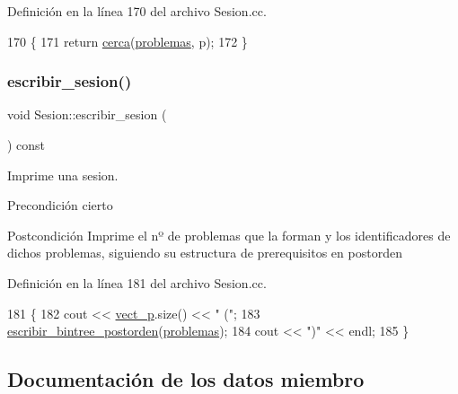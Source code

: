 Definición en la línea 170 del archivo Sesion.\+cc.


\begin{DoxyCode}
170                                                         \{
171         \textcolor{keywordflow}{return} \mbox{\hyperlink{class_sesion_a975a083d65d04704efd0690de9d7f695}{cerca}}(\mbox{\hyperlink{class_sesion_a7125fb9a733e06305e8e8889926b8d1b}{problemas}}, p);
172       \}
\end{DoxyCode}
\mbox{\label{class_sesion_a0472395ecd329355cccd46b3d3e8a8a0}} 
\subsubsection{\texorpdfstring{escribir\+\_\+sesion()}{escribir\_sesion()}}
{\footnotesize\ttfamily void Sesion\+::escribir\+\_\+sesion (\begin{DoxyParamCaption}{ }\end{DoxyParamCaption}) const}



Imprime una sesion. 

\begin{DoxyPrecond}{Precondición}
cierto 
\end{DoxyPrecond}
\begin{DoxyPostcond}{Postcondición}
Imprime el nº de problemas que la forman y los identificadores de dichos problemas, siguiendo su estructura de prerequisitos en postorden 
\end{DoxyPostcond}


Definición en la línea 181 del archivo Sesion.\+cc.


\begin{DoxyCode}
181                                          \{
182         cout << \mbox{\hyperlink{class_sesion_ab9459a157fdb5e1c2f975ba20305ae8f}{vect\_p}}.size() << \textcolor{stringliteral}{" ("};
183         \mbox{\hyperlink{class_sesion_aff16aa5e480925c7827221e326a345dc}{escribir\_bintree\_postorden}}(\mbox{\hyperlink{class_sesion_a7125fb9a733e06305e8e8889926b8d1b}{problemas}});
184         cout << \textcolor{stringliteral}{")"} << endl;
185       \}
\end{DoxyCode}


\subsection{Documentación de los datos miembro}
\mbox{\label{class_sesion_a7125fb9a733e06305e8e8889926b8d1b}} 
